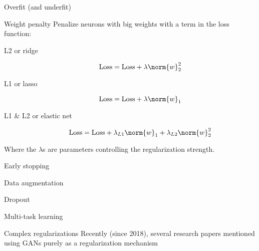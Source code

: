 \begin{frame}{Overfit (and underfit)}
\end{frame}

\begin{frame}{Weight penalty}
  Penalize neurons with big weights with a term in the loss function:

  \begin{description}
    \item[L2 or ridge]
    \[
      \text{Loss} = \text{Loss} + \lambda\norm{w}_2^2
    \]
    \item[L1 or lasso]
    \[
      \text{Loss} = \text{Loss} + \lambda\norm{w}_1
    \]
    \item[L1 \& L2 or elastic net]
    \[
      \text{Loss} = \text{Loss} + \lambda_{L1}\norm{w}_1 + \lambda_{L2}\norm{w}_2^2
    \]
  \end{description}

  Where the $\lambda$s are parameters controlling the regularization strength.
\end{frame}

\begin{frame}{Early stopping}
\end{frame}

\begin{frame}{Data augmentation}
\end{frame}

\begin{frame}{Dropout}
\end{frame}

\begin{frame}{Multi-task learning}
\end{frame}

\begin{frame}{Complex regularizations}
  Recently (since 2018), several research papers mentioned using GANs purely as a regularization mechanism

\end{frame}
